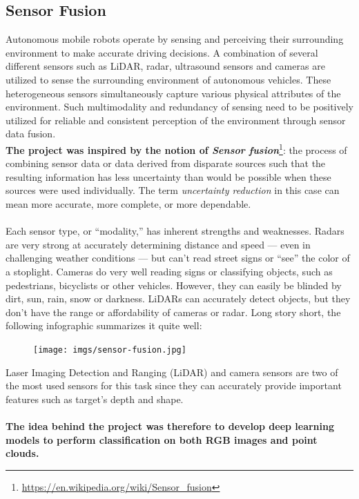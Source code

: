 \documentclass[11pt,a4paper]{article}
\begin{document}
\subsection{Sensor Fusion}
Autonomous mobile robots \cite{s18082730} operate by sensing and perceiving their surrounding environment to make accurate driving decisions. A combination of several different sensors such as LiDAR, radar, ultrasound sensors and cameras are utilized to sense the surrounding environment of autonomous vehicles. These heterogeneous sensors simultaneously capture various physical attributes of the environment. Such multimodality and redundancy of sensing need to be positively utilized for reliable and consistent perception of the environment through sensor data fusion.\\
\textbf{The project was inspired by the notion of \textit{Sensor fusion}}\footnote{\url{https://en.wikipedia.org/wiki/Sensor_fusion}}: the process of combining sensor data or data derived from disparate sources such that the resulting information has less uncertainty than would be possible when these sources were used individually. The term \textit{uncertainty reduction} in this case can mean more accurate, more complete, or more dependable.\\
\\
Each sensor type, or “modality,” has inherent strengths and weaknesses. Radars are very strong at accurately determining distance and speed — even in challenging weather conditions — but can’t read street signs or “see” the color of a stoplight. Cameras do very well reading signs or classifying objects, such as pedestrians, bicyclists or other vehicles. However, they can easily be blinded by dirt, sun, rain, snow or darkness. LiDARs can accurately detect objects, but they don’t have the range or affordability of cameras or radar. Long story short, the following infographic summarizes it quite well:
\begin{figure}[H]
    \centering
    \texttt{[image: imgs/sensor-fusion.jpg]}
\end{figure}
\noindent
Laser Imaging Detection and Ranging (LiDAR) \cite{s21123992} and camera sensors are two of the most used sensors for this task since they can accurately provide important features such as target's depth and shape.\\
\\
\textbf{The idea behind the project was therefore to develop deep learning models to perform classification on both RGB images and point clouds.}\\
\end{document}
